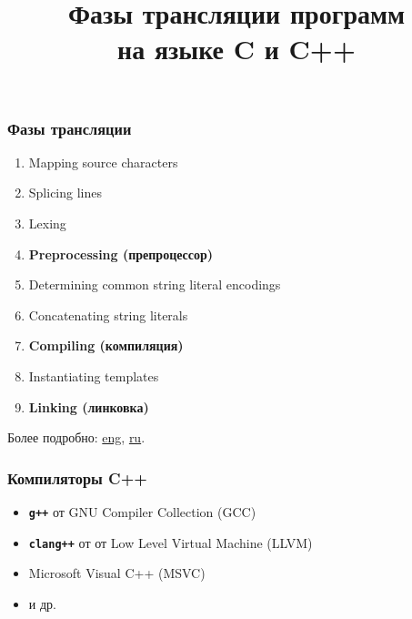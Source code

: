 \documentclass[compress]{beamer}
\title{Фазы трансляции программ \\ на языке C и C++}
\begin{document}
\frame[plain]{\titlepage}

\begin{frame}

    \frametitle{Фазы трансляции}

    \begin{enumerate}

        \item Mapping source characters

        \item Splicing lines

        \item Lexing

        \item \textbf{Preprocessing (препроцессор)}

        \item Determining common string literal encodings

        \item Concatenating string literals

        \item \textbf{Compiling (компиляция)}

        \item Instantiating templates

        \item \textbf{Linking (линковка)}

    \end{enumerate}

    \vfill

    Более подробно:
    \href{https://en.cppreference.com/w/cpp/language/translation_phases}{eng},
    \href{https://ru.cppreference.com/w/cpp/language/translation_phases}{ru}.

\end{frame}

\begin{frame}

    \frametitle{Компиляторы C++}

    \begin{itemize}

        \item \texttt{\textbf{g++}} от GNU Compiler Collection (GCC)

        \item \texttt{\textbf{clang++}} от от Low Level Virtual Machine (LLVM)

        \item Microsoft Visual C++ (MSVC)

        \item и др.

    \end{itemize}

\end{frame}
\end{document}
